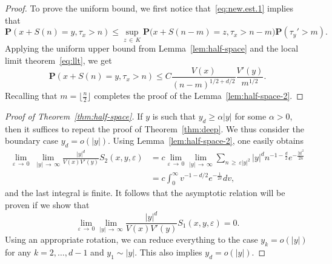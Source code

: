 \documentclass[AHL,Unicode,longabstracts,published]{cedram}
\newcommand{\pr}{\mathbf{P}}
\renewcommand{\epsilon}{\varepsilon}
\renewcommand{\le}{\leqslant}
\renewcommand{\ge}{\geqslant}
\begin{document}
\begin{proof}
To prove the uniform bound, we first notice that~\eqref{eq:new.est.1} implies that
\[
\pr\left(x+S(n)=y,\tau_x>n\right)
\le \sup_{z\,\in\,K}\pr\big(x+S(n-m)=z,\tau_x>n-m\big)
\pr\left(\tau_y'>m\right).
\]
Applying the uniform upper bound from Lemma~\ref{lem:half-space} and the local limit theorem~\eqref{eq:llt}, we get
\[
\pr\left(x+S(n)=y,\tau_x>n\right)
\le C\frac{V(x)}{(n-m)^{1/2+d/2}}\frac{V'(y)}{m^{1/2}}.
\]
Recalling that $m = \lfloor\tfrac{n}{2}\rfloor$ completes the proof of the Lemma~\ref{lem:half-space-2}.
\end{proof}



\begin{proof}[Proof of Theorem~\ref{thm:half-space}]
If $y$ is such that $y_d\ge\alpha | y|$ for some $\alpha>0$, then it suffices to repeat the proof of Theorem~\ref{thm:deep}. We thus consider the boundary case $y_d=o(| y|)$. Using Lemma~\ref{lem:half-space-2}, one easily obtains
\begin{align*}
\lim_{\varepsilon\,\to\,0}\;\lim_{|y|\,\to\,\infty}\frac{|y|^d}{V(x)V'(y)}S_2(x,y,\varepsilon) &= c\lim_{\varepsilon\,\to\,0}\lim_{|y|\,\to\,\infty}\sum_{n\,\ge\,\epsilon|y|^2}|y|^dn^{-1-\frac{d}{2}}e^{-\frac{|y|^2}{2n}}
\\
&= c\int_0^{\infty}v^{-1-{d}/{2}}e^{-\frac{1}{2v}}dv,
\end{align*}
and the last integral is finite. It follows that the asymptotic relation will be proven if we show that
\begin{equation}\label{half-space.1}
\lim_{\varepsilon\,\to\,0}\lim_{|y|\,\to\,\infty}\frac{|y|^d}{V(x)V'(y)}S_1(x,y,\varepsilon)=0.
\end{equation}
Using an appropriate rotation, we can reduce everything to the case $y_k=o(|y|)$ for any $k=2,\ldots,d-1$ and $y_1\sim |y|$. This also implies $y_d = o(|y|)$.


\end{proof}
\end{document}
